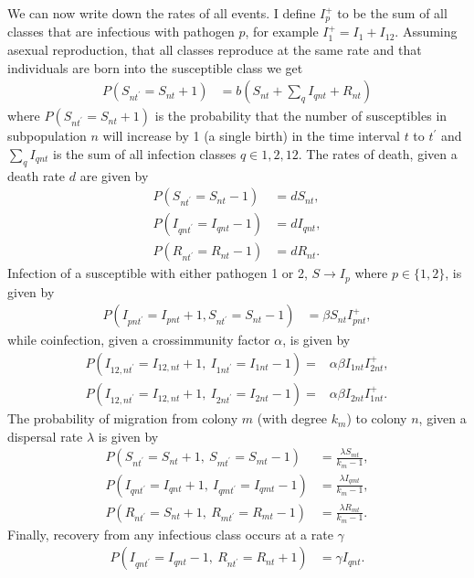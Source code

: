 We can now write down the rates of all events. 
I define $I^+_p$ to be the sum of all classes that are infectious with pathogen $p$, for example $I^+_1 = I_1 + I_{12}$. 
Assuming asexual reproduction, that all classes reproduce at the same rate and that individuals are born into the susceptible class we get
\begin{align}
  P\left( S_{nt^\prime} = S_{nt} +1\right) &= b\left( S_{nt}+\sum_q I_{qnt} + R_{nt}\right) 
\end{align}
where $P\left( S_{nt^\prime} = S_{nt} +1\right)$ is the probability that the number of susceptibles in subpopulation $n$ will increase by 1 (a single birth) in the time interval $t$ to $t^\prime$ and $\sum_q I_{qnt}$ is the sum of all infection classes $q \in {1, 2, 12}$.
The rates of death, given a death rate $d$ are given by
\begin{align}
  P\left( S_{nt^\prime} = S_{nt}-1 \right) &= dS_{nt}, \\
  P\left( I_{qnt^\prime} = I_{qnt}-1 \right) &= dI_{qnt},\\
  P\left( R_{nt^\prime} = R_{nt}-1 \right) &= dR_{nt}.
\end{align}
Infection of a susceptible with either pathogen 1 or 2, $S \rightarrow I_p$ where $p\in \{1,2\}$, is given by
\begin{align}
  P\left( I_{pnt^\prime} = I_{pnt}+1, S_{nt^\prime} = S_{nt}-1 \right) &= \beta S_{nt}I^+_{pnt},
\end{align}
while coinfection, given a crossimmunity factor $\alpha$, is given by
\begin{align}
  P\left( I_{12,nt^\prime} = I_{12,nt}+1,\: I_{1nt^\prime} = I_{1nt}-1\right) = &\alpha\beta I_{1nt}I^+_{2nt},\\
  P\left( I_{12,nt^\prime} = I_{12,nt}+1,\: I_{2nt^\prime} = I_{2nt}-1\right) = &\alpha\beta I_{2nt}I^+_{1nt}.
\end{align}
The probability of migration from colony $m$ (with degree $k_m$) to colony $n$, given a dispersal rate $\lambda$ is given by
\begin{align}
  P\left(S_{nt^\prime}=S_{nt}+1,\: S_{mt^\prime} = S_{mt}-1\right) &= \frac{\lambda S_{mt}}{k_m-1},\\
  P\left(I_{qnt^\prime}=I_{qnt}+1,\: I_{qmt^\prime} = I_{qmt}-1\right) &= \frac{\lambda I_{qmt}}{k_m-1},\\
  P\left(R_{nt^\prime}=S_{nt}+1,\: R_{mt^\prime} = R_{mt}-1\right) &= \frac{\lambda R_{mt}}{k_m-1}.
\end{align}
Finally, recovery from any infectious class occurs at a rate $\gamma$
\begin{align}
  P\left( I_{qnt^\prime} = I_{qnt}-1,\: R_{nt^\prime} = R_{nt}+1 \right) &= \gamma I_{qnt}.
\end{align}


